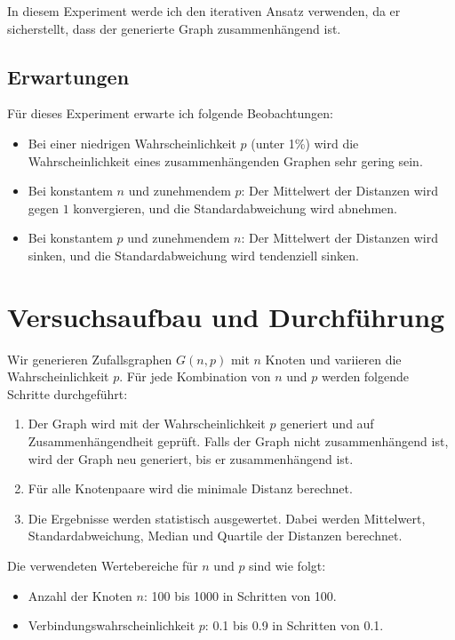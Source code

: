 In diesem Experiment werde ich den iterativen Ansatz verwenden, da er sicherstellt, dass der generierte Graph zusammenhängend ist.

\subsection{Erwartungen}

Für dieses Experiment erwarte ich folgende Beobachtungen:

\begin{itemize}
    \item Bei einer niedrigen Wahrscheinlichkeit \( p \) (unter 1\%) wird die Wahrscheinlichkeit eines zusammenhängenden Graphen sehr gering sein.
    \item Bei konstantem \( n \) und zunehmendem \( p \): Der Mittelwert der Distanzen wird gegen \( 1 \) konvergieren, und die Standardabweichung wird abnehmen.
    \item Bei konstantem \( p \) und zunehmendem \( n \): Der Mittelwert der Distanzen wird sinken, und die Standardabweichung wird tendenziell sinken.
\end{itemize}

\section{Versuchsaufbau und Durchführung}
Wir generieren Zufallsgraphen $G(n, p)$ mit $n$ Knoten und variieren die Wahrscheinlichkeit $p$. Für jede Kombination von $n$ und $p$ werden folgende Schritte durchgeführt:
\begin{enumerate}
    \item Der Graph wird mit der Wahrscheinlichkeit $p$ generiert und auf Zusammenhängendheit geprüft. Falls der Graph nicht zusammenhängend ist, wird der Graph neu generiert, bis er zusammenhängend ist.
    \item Für alle Knotenpaare wird die minimale Distanz berechnet.
    \item Die Ergebnisse werden statistisch ausgewertet. Dabei werden Mittelwert, Standardabweichung, Median und Quartile der Distanzen berechnet.
\end{enumerate}

Die verwendeten Wertebereiche für $n$ und $p$ sind wie folgt:
\begin{itemize}
    \item Anzahl der Knoten $n$: 100 bis 1000 in Schritten von 100.
    \item Verbindungswahrscheinlichkeit $p$: 0.1 bis 0.9 in Schritten von 0.1.
\end{itemize}

